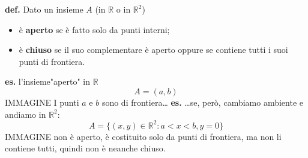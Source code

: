 \newline
\textbf{def.} Dato un insieme $A$ (in $\mathbb{R}$ o in $\mathbb{R}^2$)
\begin{itemize}
    \item è \textbf{aperto} se è fatto solo da punti interni;
    \item è \textbf{chiuso} se il suo complementare è aperto oppure se contiene tutti i suoi punti di frontiera.
\end{itemize}
\textbf{es.} l'insieme"aperto" in $\mathbb{R}$
\[
    A = (a,b)
\] 
IMMAGINE
\newline
I punti $a$ e $b$ sono di frontiera\dots
\newline
\textbf{es.} \dots se, però, cambiamo ambiente e andiamo in $\mathbb{R}^2$:
\[
    A = \{(x,y) \in \mathbb{R}^2 : a < x < b, y = 0\}
\] 
IMMAGINE
\newline
non è aperto, è costituito solo da punti di frontiera, ma non li contiene tutti, quindi non è neanche chiuso.

\newpage